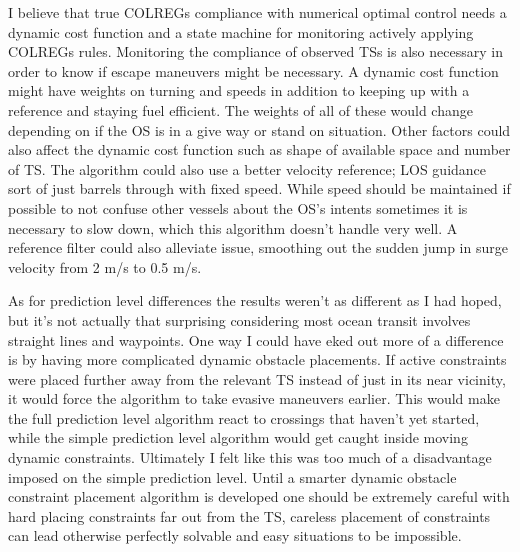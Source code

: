 I believe that true COLREGs compliance with numerical optimal control needs a dynamic cost function and a state machine for monitoring actively applying COLREGs rules.
Monitoring the compliance of observed TSs is also necessary in order to know if escape maneuvers might be necessary. A dynamic cost function might have weights on turning and speeds 
in addition to keeping up with a reference and staying fuel efficient. The weights of all of these would change depending on if the OS is in a give way or stand on situation.
Other factors could also affect the dynamic cost function such as shape of available space and number of TS. The algorithm could also use a better velocity reference; LOS guidance
sort of just barrels through with fixed speed. While speed should be maintained if possible to not confuse other vessels about the OS's intents sometimes it is necessary to slow down, which
this algorithm doesn't handle very well. A reference filter could also alleviate issue, smoothing out the sudden jump in surge velocity from 2 m/s to 0.5 m/s.

As for prediction level differences the results weren't as different as I had hoped, but it's not actually that surprising considering most ocean transit
involves straight lines and waypoints. One way I could have eked out more of a difference is by having more complicated dynamic obstacle placements. If active constraints were placed
further away from the relevant TS instead of just in its near vicinity, it would force the algorithm to take evasive maneuvers earlier. This would make the full prediction
level algorithm react to crossings that haven't yet started, while the simple prediction level algorithm would get caught inside moving dynamic constraints. Ultimately I felt like
this was too much of a disadvantage imposed on the simple prediction level. Until a smarter dynamic obstacle constraint placement algorithm is developed one should be
extremely careful with hard placing constraints far out from the TS, careless placement of constraints can lead otherwise perfectly solvable and easy situations to be impossible.

